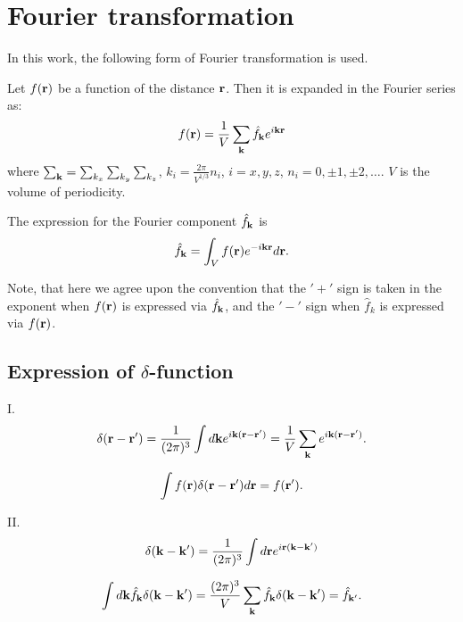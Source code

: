 \section{\label{sec:fourier} Fourier transformation}
In this work, the following form of Fourier transformation is used.

Let $f(\vb r)$ be a function of the distance $\vb r$. Then it is expanded in the Fourier series as:
\begin{equation}
	f(\vb r) = \frac{1}{V} \sum_{\vb k} \hat{f}_{\vb k} e^{i\vb k \vb r}
\end{equation}
where $\sum_{\vb k} = \sum_{k_x}\sum_{k_y}\sum_{k_z}$, $k_i = \frac{2\pi}{V^{1/3}}n_i$, $i=x,y,z$, $n_i=0,\pm 1, \pm 2, \dotsc$. $V$ is the volume of periodicity.

The expression for the Fourier component $\hat{f}_{\vb k}$ is
\begin{equation}
	\hat{f}_{\vb k} = \int_V f(\vb r) e^{-i\vb k \vb r} d{\vb r}.
\end{equation}

Note, that here we agree upon the convention that the $'+'$ sign is taken in the exponent when $f(\vb r)$ is expressed via $\hat{f}_{\vb k}$, and the $'-'$ sign when $\hat{f}_{k}$ is expressed via $f(\vb r)$.

\subsection*{Expression of $\delta$-function}

I.
\begin{equation}
	\delta(\vb r - \vb r') = \frac{1}{(2\pi)^3}\int d {\vb k} e^{i\vb k (\vb r - \vb r')} = \frac{1}{V} \sum_{\vb k} e^{i\vb k(\vb r - \vb r')}.
\end{equation}

\begin{equation}
	\int f(\vb r) \delta(\vb r - \vb r') d {\vb r} = f(\vb r').
\end{equation}

II.
\begin{equation}
	\delta(\vb k - \vb k') = \frac{1}{(2\pi)^3} \int d{\vb r} e^{i\vb r (\vb k - \vb k')}
\end{equation}

\begin{equation}
	\int d{\vb k} \hat{f}_{\vb k} \delta(\vb k - \vb k') = \frac{(2\pi)^3}{V} \sum_{\vb k} \hat{f}_{\vb k} \delta(\vb k - \vb k') = \hat{f}_{\vb k'}.
\end{equation}

